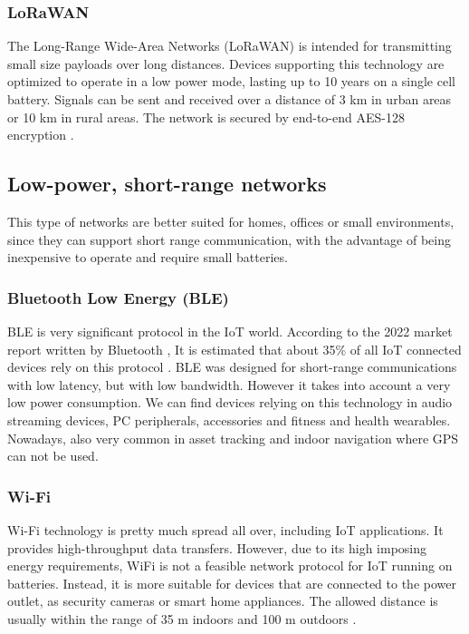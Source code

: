\subsubsection{LoRaWAN}
The Long-Range Wide-Area Networks (LoRaWAN) is intended for transmitting small size payloads over long distances. Devices supporting this technology are optimized to operate in a low power mode, lasting up to 10 years on a single cell battery. Signals can be sent and received over a distance of 3 km in urban areas or 10 km in rural areas. The network is secured by end-to-end AES-128 encryption \cite{LoRaWAN}.

\subsection{Low-power, short-range networks}
This type of networks are better suited for homes, offices or small environments, since they can support short range communication, with the advantage of being inexpensive to operate and require small batteries.

\subsubsection{Bluetooth Low Energy (BLE)}
BLE is very significant protocol in the IoT world. According to the 2022 market report written by Bluetooth \textregistered, It is estimated that about 35\% of all IoT connected devices rely on this protocol \cite{BLE1}.
BLE was designed for short-range communications with low latency, but with low bandwidth. However it takes into account a very low power consumption. We can find devices relying on this technology in audio streaming devices, PC peripherals, accessories and fitness and health wearables. Nowadays, also very common in asset tracking and indoor navigation where GPS can not be used.

\subsubsection{Wi-Fi} \label{sec:wifi}
Wi-Fi technology is pretty much spread all over, including IoT applications. It provides high-throughput data transfers. However, due to its high imposing energy requirements, WiFi is not a feasible network protocol for IoT running on batteries. Instead, it is more suitable for devices that are connected to the power outlet, as security cameras or smart home appliances. The allowed distance is usually within the range of 35 m indoors and 100 m outdoors \cite{IEEE:protocols2}.

